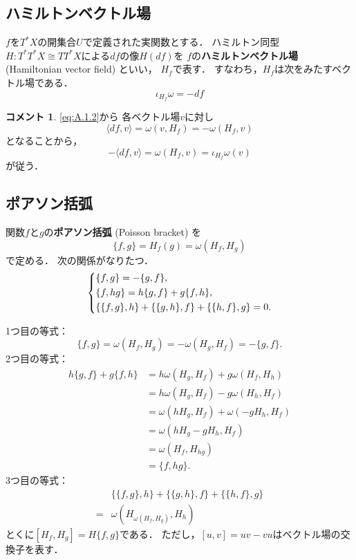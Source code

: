 \documentclass[leqno, 10pt, a4paper, dvipdfmx]{jsarticle}
\makeatletter
\theoremstyle{definition}
\renewenvironment{proof}[1][\proofname]{\par
  \pushQED{\qed}%
  \normalfont \topsep6\p@\@plus6\p@\relax
  \trivlist
  \item[\hskip\labelsep
         \bfseries
    {#1}]\ignorespaces
}{%
  \popQED\endtrivlist\@endpefalse
}
\renewcommand{\proofname}{証明.}
\numberwithin{equation}{section}
\theoremstyle{mystyle}
\newtheorem*{CMT*}{コメント}
\def\inner<#1>{\langle #1 \rangle}
\newcommand{\cotb}[1][]{T^{\ast}{#1}}
\makeatother
\begin{document}
\subsection*{ハミルトンベクトル場}

\(f\)を\(\cotb[X]\)の開集合\(U\)で定義された実関数とする．
ハミルトン同型\(
    H\colon \cotb[{\cotb[X]}]\cong T\cotb[X]
\)による\(df\)の像\(H(df)\)を
\(f\)の\textbf{ハミルトンベクトル場} (Hamiltonian vector field) といい，
\(H_f\)で表す．
すなわち，\(H_f\)は次をみたすベクトル場である．
\[
    \iota_{H_f}\omega=-df
\]
\begin{CMT*}
    \eqref{eq:A.1.2}から
    各ベクトル場\(v\)に対し
    \[    
        \inner<df,v>
        =\omega(v,H_f)
        =-\omega(H_f,v)
    \]
    となることから，
    \[
        -\inner<df,v>
        =\omega(H_f,v)
        =\iota_{H_f}\omega(v)
    \]
    が従う．
\end{CMT*}

\subsection*{ポアソン括弧}

関数\(f\)と\(g\)の\textbf{ポアソン括弧} (Poisson bracket) を
\begin{equation}\label{eq:A.2.3}
    \{f,g\}=H_f(g)=\omega(H_f,H_g)
\end{equation}
で定める．
次の関係がなりたつ．
\begin{equation}
    \begin{dcases}
        \{f,g\}=-\{g,f\},\\
        \{f,hg\}=h\{g,f\}+g\{f,h\},\\
        \{\{f,g\},h\}+\{\{g,h\},f\}+\{\{h,f\},g\}=0.
    \end{dcases}
\end{equation}
\begin{proof}
    1つ目の等式：    
    \[
        \{f,g\}=\omega(H_f,H_g)=-\omega(H_g,H_f)=-\{g,f\}.
    \]
    2つ目の等式：    
    \begin{align*}
        h\{g,f\}+g\{f,h\}
        &=h\omega(H_g,H_f)+g\omega(H_f,H_h)\\
        &=h\omega(H_g,H_f)-g\omega(H_h,H_f)\\
        &=\omega(hH_g,H_f)+\omega(-gH_h,H_f)\\
        &=\omega(hH_g-gH_h,H_f)\\
        &=\omega(H_f,H_{hg})\\
        &=\{f,hg\}.
    \end{align*}
    3つ目の等式：
    \begin{align*}
        &\{\{f,g\},h\}+\{\{g,h\},f\}+\{\{h,f\},g\}\\
        =&\omega(H_{\omega(H_f,H_g)},H_h)
    \end{align*}
\end{proof}
とくに\([H_f,H_g]=H{\{f,g\}}\)である．
ただし，\([u,v]=uv-vu\)はベクトル場の交換子を表す．
\end{document}
